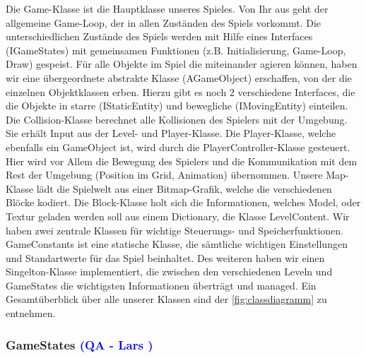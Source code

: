 \documentclass[12pt]{article}
\begin{document}
Die Game-Klasse ist die Hauptklasse unseres Spieles. Von Ihr aus geht der allgemeine Game-Loop, der in allen Zuständen des Spiels vorkommt. Die
unterschiedlichen Zustände des Spiels werden mit Hilfe eines Interfaces (IGameStates) mit gemeinsamen Funktionen (z.B. Initialisierung, Game-Loop, Draw) gespeist.
Für alle Objekte im Spiel die miteinander agieren können, haben wir eine übergeordnete abstrakte Klasse (AGameObject) erschaffen, von der die einzelnen Objektklassen erben.
Hierzu gibt es noch 2 verschiedene Interfaces, die die Objekte in starre (IStaticEntity) und bewegliche (IMovingEntity) einteilen.
Die Collision-Klasse berechnet alle Kollisionen des Spielers mit der Umgebung. Sie erhält Input
aus der Level- und Player-Klasse.
Die Player-Klasse, welche ebenfalls ein GameObject ist, wird durch die PlayerController-Klasse
gesteuert. Hier wird vor Allem die Bewegung des Spielers und die Kommunikation mit dem Rest der Umgebung (Position im Grid, Animation) übernommen.
Unsere Map-Klasse lädt die Spielwelt aus einer Bitmap-Grafik, welche die verschiedenen Blöcke kodiert.
Die Block-Klasse holt sich die Informationen, welches Model, oder Textur geladen werden soll aus einem Dictionary, die Klasse LevelContent.
Wir haben zwei zentrale Klassen für wichtige Steuerungs- und Speicherfunktionen. GameConstants ist eine statische Klasse, die sämtliche wichtigen
Einstellungen und Standartwerte für das Spiel beinhaltet. Des weiteren haben wir einen Singelton-Klasse implementiert, die zwischen den verschiedenen
Leveln und GameStates die wichtigsten Informationen überträgt und managed.
Ein Gesamtüberblick über alle unserer Klassen sind der \ref{fig:classdiagramm} zu entnehmen.

\vspace{1cm}
\subsubsection{GameStates \textcolor{blue}{(QA - Lars )}}
\end{document}

